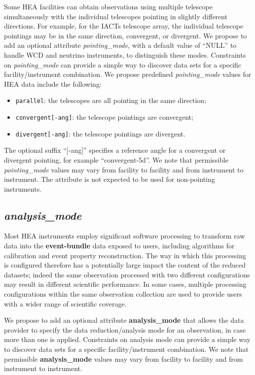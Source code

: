 \documentclass[11pt,a4paper]{ivoa}
\begin{document}
Some \gls{HEA} facilities can obtain observations using multiple telescope simultaneously with the individual telescopes pointing in slightly different directions.  For example, for the \glspl{IACT} telescope array, the individual telescope pointings may be in the same direction, convergent, or divergent.  We propose to add an optional attribute {\em pointing\_mode\/}, with a default value of ``NULL'' to handle \gls{WCD} and neutrino instruments, to distinguish these modes.  Constraints on {\em pointing\_mode\/} can provide a simple way to discover data sets for a specific facility/instrument combination.  We propose predefined {\em pointing\_mode\/} values for \gls{HEA} data include the following:
\begin{itemize}
	\item \texttt{parallel}: the telescopes are all pointing in the same direction;
	\item \texttt{convergent[-ang]}: the telescope pointings are convergent;
	\item \texttt{divergent[-ang]}: the telescope pointings are divergent.
\end{itemize}
The optional suffix ``[-ang]'' specifies a reference angle for a convergent or divergent pointing, for example ``convergent-5d''.  We note that permissible {\em pointing\_mode\/} values may vary from facility to facility and from instrument to instrument. The attribute is not expected to be used for non-pointing instruments.

\subsection{{\em analysis\_mode}}

Most \gls{HEA} instruments employ significant software processing to transform raw data into the {\bf event-bundle} data exposed to users, including algorithms for calibration and event property reconstruction. The way in which this processing is configured therefore has a potentially large impact the content of the reduced datasets; indeed the same observation processed with two different configurations may result in different scientific performance. In some cases, multiple processing configurations within the same observation collection are used to provide users with a wider range of scientific coverage.

We propose to add an optional attribute {\bf analysis\_mode} that allows the data provider to specify the data reduction/analysis mode for an observation, in case more than one is applied. Constraints on analysis mode can provide a simple way to discover data sets for a specific facility/instrument combination. We note that permissible {\bf analysis\_mode} values may vary from facility to facility and from instrument to instrument.
\end{document}
